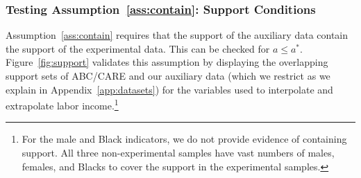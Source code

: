 \subsubsection{Testing Assumption~\ref{ass:contain}: Support Conditions}\label{app:containsupport}

Assumption~\ref{ass:contain} requires that the support of the auxiliary data contain the support of the experimental data. This can be checked for $a \leq a^\ast$. Figure~\ref{fig:support} validates this assumption by displaying the overlapping support sets of ABC/CARE and our auxiliary data (which we restrict as we explain in Appendix~\ref{app:datasets}) for the variables used to interpolate and extrapolate labor income.\footnote{For the male and Black indicators, we do not provide evidence of containing support. All three non-experimental samples have vast numbers of males, females, and Blacks to cover the support in the experimental samples.}


